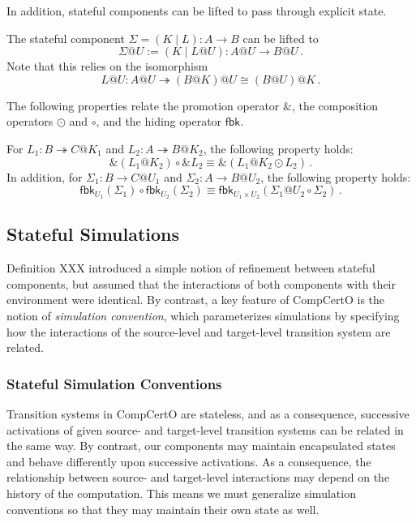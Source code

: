 \documentclass[acmsmall,screen,review,anonymous]{acmart}
\newcommand{\kw}[1]{\ensuremath{ \mathsf{#1} }}
\begin{document}
In addition,
stateful components can be lifted
to pass through explicit state.

\begin{definition} \label{def:slift}
The stateful component $\Sigma = (K \mid L) : A \rightarrow B$
can be lifted to \[ \Sigma@U := (K \mid L@U) : A@U \rightarrow B@U \,. \]
Note that this relies on the isomorphism
\[
  L@U : A@U \twoheadrightarrow (B@K)@U \cong (B@U)@K
  \,.
\]
\end{definition}

The following properties
relate the promotion operator $\&$,
the composition operators $\odot$ and $\circ$,
and the hiding operator $\kw{fbk}$.

\begin{lemma}
  For $L_1 : B \twoheadrightarrow C@K_1$ and
  $L_2 : A \twoheadrightarrow B@K_2$,
  the following property holds:
  \[
    \&(L_1@K_2) \circ \&L_2 \equiv \&(L_1@K_2 \odot L_2)
    \,.
  \]
  In addition, for $\Sigma_1 : B \rightarrow C@U_1$
  and $\Sigma_2 : A \rightarrow B@U_2$,
  the following property holds:
  \[
    \kw{fbk}_{U_1}(\Sigma_1) \circ \kw{fbk}_{U_2}(\Sigma_2) \equiv
    \kw{fbk}_{U_1 \times U_2}(\Sigma_1@U_2 \circ \Sigma_2)
    \,.
  \]
\end{lemma}


\subsection{Stateful Simulations} %

Definition XXX introduced a simple notion of refinement
between stateful components,
but assumed that the interactions of both components
with their environment were identical.
By contrast, a key feature of CompCertO
is the notion of \emph{simulation convention},
which parameterizes simulations by
specifying how the interactions of
the source-level and target-level transition system
are related.

\subsubsection{Stateful Simulation Conventions} %

Transition systems in CompCertO are stateless,
and as a consequence,
successive activations of given
source- and target-level
transition systems can be related in the same way.
By contrast,
our components may maintain encapsulated states
and behave differently upon successive activations.
As a consequence,
the relationship between source- and target-level interactions
may depend on the history of the computation.
This means we must generalize simulation conventions
so that they may maintain their own state as well.
\end{document}
